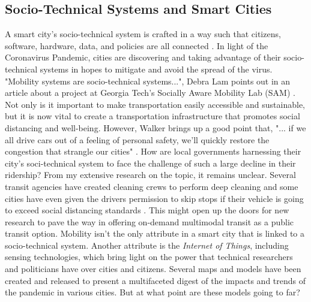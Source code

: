 \documentclass[12pt]{article}
\begin{document}
\subsection*{Socio-Technical Systems and Smart Cities}
A smart city's socio-technical system is crafted in a way such that citizens, software, hardware, data, and policies are all connected \cite{rangwala_2018}.
In light of the Coronavirus Pandemic, cities are discovering and taking advantage of their
socio-technical systems in hopes to mitigate and avoid the spread of the virus. "Mobility systems are socio-technical systems...", Debra Lam points out in an article about
a project at Georgia Tech's Socially Aware Mobility Lab (SAM) \cite{levine_2020}. Not only is it important to make transportation easily accessible and sustainable,
but it is now vital to create a transportation infrastructure that promotes social distancing and well-being. However, Walker brings up a good point that, "...
if we all drive cars out of a feeling of personal safety, we'll quickly restore the congestion that strangle our cities" \cite{walker_2020}. How are local governments
harnessing their city's soci-technical system to face the challenge of such a large decline in their ridership? From my extensive research on the topic, it remains unclear.
Several transit agencies have created cleaning crews to perform deep cleaning and some cities have even given the drivers permission to skip stops if their vehicle is going 
to exceed social distancing standards \cite{hawkins_2020}. This might open up the doors for new research to pave the way in offering on-demand multimodal transit as a public transit 
option. Mobility isn't the only attribute in a smart city that is linked to a socio-technical system. Another attribute is the \textit{Internet of Things}, including sensing technologies, 
which bring light on the power that technical researchers and politicians have over cities and citizens. Several maps and models have been created and 
released to present a multifaceted digest of the impacts and trends of the pandemic in various cities. But at what point are these models going to far? 
\end{document}

